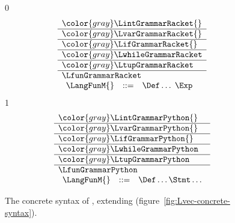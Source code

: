 \documentclass[7x10]{TimesAPriori_MIT}%
\newcommand{\gray}[1]{{\color{gray} #1}}
\def\racketEd{0}
\def\pythonEd{1}
\def\edition{1}
\newcommand{\pythonColor}[0]{}
\numberwithin{theorem}{chapter}
\numberwithin{definition}{chapter}
\numberwithin{equation}{chapter}
\begin{document}
\begin{figure}[tp]
\centering
\begin{tcolorbox}[colback=white]
    \small
{\if\edition\racketEd    
\[
\begin{array}{l}
  \gray{\LintGrammarRacket{}} \\ \hline
  \gray{\LvarGrammarRacket{}} \\ \hline
  \gray{\LifGrammarRacket{}} \\ \hline
  \gray{\LwhileGrammarRacket} \\ \hline
  \gray{\LtupGrammarRacket} \\   \hline
  \LfunGrammarRacket \\  
  \begin{array}{lcl}
  \LangFunM{} &::=& \Def \ldots \; \Exp
  \end{array}
\end{array}
\]
\fi}
{\if\edition\pythonEd\pythonColor
\[
\begin{array}{l}
  \gray{\LintGrammarPython{}} \\ \hline
  \gray{\LvarGrammarPython{}} \\ \hline
  \gray{\LifGrammarPython{}} \\ \hline
  \gray{\LwhileGrammarPython} \\ \hline
  \gray{\LtupGrammarPython} \\  \hline
  \LfunGrammarPython \\
\begin{array}{rcl}
  \LangFunM{} &::=& \Def\ldots \Stmt\ldots
\end{array}
\end{array}
\]
\fi}
\end{tcolorbox}

\caption{The concrete syntax of \LangFun{}, extending \LangVec{} (figure~\ref{fig:Lvec-concrete-syntax}).}
\label{fig:Lfun-concrete-syntax}
\end{figure}
\end{document}
